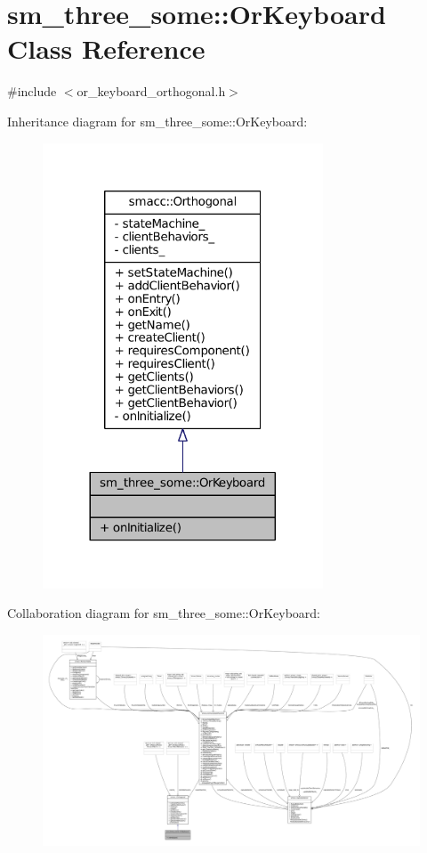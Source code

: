 \hypertarget{classsm__three__some_1_1OrKeyboard}{}\section{sm\+\_\+three\+\_\+some\+:\+:Or\+Keyboard Class Reference}
\label{classsm__three__some_1_1OrKeyboard}


{\ttfamily \#include $<$or\+\_\+keyboard\+\_\+orthogonal.\+h$>$}



Inheritance diagram for sm\+\_\+three\+\_\+some\+:\+:Or\+Keyboard\+:
\nopagebreak
\begin{figure}[H]
\begin{center}
\leavevmode
\includegraphics[width=236pt]{classsm__three__some_1_1OrKeyboard__inherit__graph}
\end{center}
\end{figure}


Collaboration diagram for sm\+\_\+three\+\_\+some\+:\+:Or\+Keyboard\+:
\nopagebreak
\begin{figure}[H]
\begin{center}
\leavevmode
\includegraphics[width=350pt]{classsm__three__some_1_1OrKeyboard__coll__graph}
\end{center}
\end{figure}
